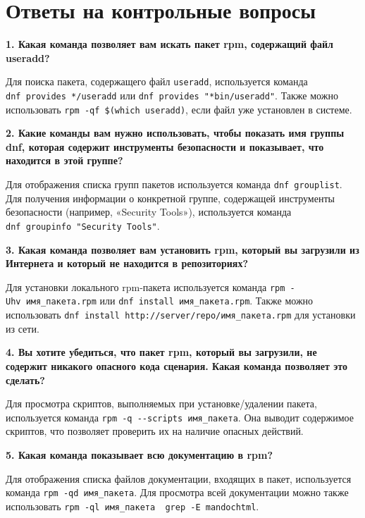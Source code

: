 \documentclass[
  english,
  russian,
  12pt,
  a4paper,
  DIV=11,
  numbers=noendperiod]{scrreprt}
\begin{document}
\chapter{Ответы на контрольные
вопросы}\label{ux43eux442ux432ux435ux442ux44b-ux43dux430-ux43aux43eux43dux442ux440ux43eux43bux44cux43dux44bux435-ux432ux43eux43fux440ux43eux441ux44b}

\textbf{1. Какая команда позволяет вам искать пакет rpm, содержащий файл
useradd?}

Для поиска пакета, содержащего файл \texttt{useradd}, используется
команда \texttt{dnf\ provides\ */useradd} или
\texttt{dnf\ provides\ "*bin/useradd"}. Также можно использовать
\texttt{rpm\ -qf\ \$(which\ useradd)}, если файл уже установлен в
системе.

\textbf{2. Какие команды вам нужно использовать, чтобы показать имя
группы dnf, которая содержит инструменты безопасности и показывает, что
находится в этой группе?}

Для отображения списка групп пакетов используется команда
\texttt{dnf\ grouplist}. Для получения информации о конкретной группе,
содержащей инструменты безопасности (например, «Security Tools»),
используется команда \texttt{dnf\ groupinfo\ "Security\ Tools"}.

\textbf{3. Какая команда позволяет вам установить rpm, который вы
загрузили из Интернета и который не находится в репозиториях?}

Для установки локального rpm-пакета используется команда
\texttt{rpm\ -Uhv\ имя\_пакета.rpm} или
\texttt{dnf\ install\ имя\_пакета.rpm}. Также можно использовать
\texttt{dnf\ install\ http://server/repo/имя\_пакета.rpm} для установки
из сети.

\textbf{4. Вы хотите убедиться, что пакет rpm, который вы загрузили, не
содержит никакого опасного кода сценария. Какая команда позволяет это
сделать?}

Для просмотра скриптов, выполняемых при установке/удалении пакета,
используется команда \texttt{rpm\ -q\ -\/-scripts\ имя\_пакета}. Она
выводит содержимое скриптов, что позволяет проверить их на наличие
опасных действий.

\textbf{5. Какая команда показывает всю документацию в rpm?}

Для отображения списка файлов документации, входящих в пакет,
используется команда \texttt{rpm\ -qd\ имя\_пакета}. Для просмотра всей
документации можно также использовать
\texttt{rpm\ -ql\ имя\_пакета\ \textbar{}\ grep\ -E\ \textquotesingle{}man\textbar{}doc\textbar{}html\textquotesingle{}}.
\end{document}
